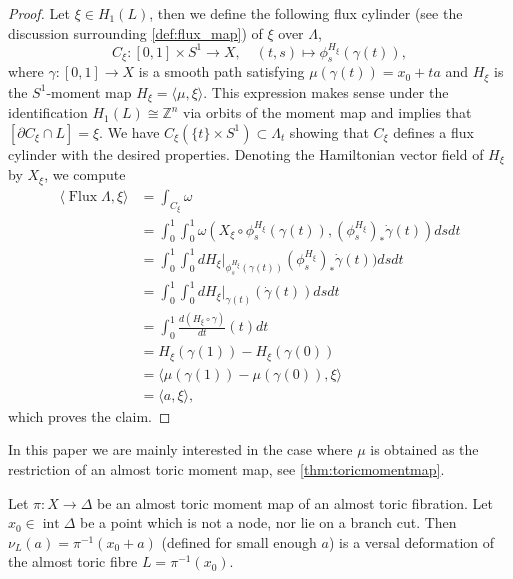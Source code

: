 \documentclass[12pt,a4paper,draft]{scrartcl}
\begin{document}
\begin{proof}
    Let $\xi \in H_1(L)$, then we define the following flux cylinder (see the discussion surrounding \cref{def:flux_map}) of $\xi$ over $\Lambda$, 
    \begin{equation}
        C_{\xi} \colon [0,1] \times S^1 \rightarrow X, \quad
        (t,s) \mapsto \phi_s^{H_{\xi}}(\gamma(t)),
    \end{equation}
    where $\gamma \colon [0,1] \rightarrow X$ is a smooth path satisfying $\mu(\gamma(t)) = x_0 + ta$ and $H_{\xi}$ is the $S^1$-moment map $H_{\xi} = \langle \mu , \xi \rangle$. This expression makes sense under the identification $H_1(L) \cong \mathbb{Z}^n$ via orbits of the moment map and implies that $[\partial C_{\xi} \cap L] = \xi$. We have $C_{\xi}(\{t\} \times S^1) \subset \Lambda_t$ showing that $C_{\xi}$ defines a flux cylinder with the desired properties. Denoting the Hamiltonian vector field of $H_{\xi}$ by $X_{\xi}$, we compute
    \begin{align*}
        \langle \operatorname{Flux} \Lambda , \xi \rangle
        &= \int_{C_{\xi}} \omega \\
        &= \int_0^1 \int_0^1 \omega(X_{\xi} \circ \phi_s^{H_{\xi}}(\gamma(t)) , (\phi_s^{H_{\xi}})_*\dot{\gamma}(t) ) ds dt \\
        &= \int_0^1 \int_0^1 dH_{\xi}\vert_{\phi_s^{H_{\xi}}(\gamma(t))} (\phi_s^{H_{\xi}})_*\dot{\gamma}(t) ) ds dt \\
        &= \int_0^1 \int_0^1 dH_{\xi}\vert_{\gamma(t)} (\dot{\gamma}(t) ) ds dt \\
        &= \int_0^1 \frac{d (H_{\xi} \circ \gamma)}{dt} (t) dt \\
        &= H_{\xi}(\gamma(1)) - H_{\xi}(\gamma(0)) \\
        &= \langle \mu(\gamma(1)) - \mu(\gamma(0)), \xi \rangle \\
        &= \langle a , \xi \rangle,
    \end{align*}
which proves the claim.
\end{proof}


In this paper we are mainly interested in the case where $\mu$ is obtained as the restriction of an almost toric moment map, see \cref{thm:toricmomentmap}. 

\begin{corollary}
    \label{cor:VDatffibres}
    Let $\pi \colon X \rightarrow \Delta$ be an almost toric moment map of an almost toric fibration. Let $x_0 \in \operatorname{int}\Delta$ be a point which is not a node, nor lie on a branch cut. Then $\nu_L(a) = \pi^{-1}(x_0 + a)$ (defined for small enough $a$) is a versal deformation of the almost toric fibre $L = \pi^{-1}(x_0)$.
\end{corollary}
\end{document}
